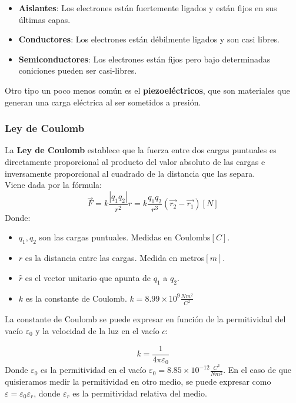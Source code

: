 \begin{itemize}
    \item \textbf{Aislantes}: Los electrones están fuertemente ligados y están fijos en sus últimas capas. 
    \item \textbf{Conductores}: Los electrones están débilmente ligados y son casi libres.
    \item \textbf{Semiconductores}: Los electrones están fijos pero bajo determinadas coniciones pueden ser casi-libres.
\end{itemize}
Otro tipo un poco menos común es el \textbf{piezoeléctricos}, que son materiales que generan una carga eléctrica al ser sometidos a presión.
\subsubsection{Ley de Coulomb}
La \textbf{Ley de Coulomb} establece que la fuerza entre dos cargas puntuales es directamente proporcional al producto del valor absoluto de las cargas e inversamente proporcional al cuadrado de la distancia que las separa.\\
Viene dada por la fórmula:
\begin{equation}
    \vec{F} = k \frac{|q_1 q_2|}{r^2} \hat{r} = k \frac{q_1 q_2}{r^3} (\vec{r_2} - \vec{r_1}) [N]
\end{equation}
Donde: 
\begin{itemize}
    \item $q_1, q_2$ son las cargas puntuales. Medidas en Coulombs$[C]$.
    \item $r$ es la distancia entre las cargas. Medida en metros$[m]$.
    \item $\hat{r}$ es el vector unitario que apunta de $q_1$ a $q_2$.
    \item $k$ es la constante de Coulomb. $k = 8.99 \times 10^9 \frac{Nm^2}{C^2}$
\end{itemize}

\noindent
La constante de Coulomb se puede expresar en función de la permitividad del vacío $\varepsilon_0$ y la velocidad de la luz en el vacío $c$:

\begin{equation}
    k = \frac{1}{4\pi \varepsilon_0}
\end{equation}
Donde $\varepsilon_0$ es la permitividad en el vacío $\varepsilon_0 = 8.85 \times 10^{-12} \frac{C^2}{Nm^2}$. En el caso de que quisieramos medir la permitividad en otro medio, se puede expresar como $\varepsilon = \varepsilon_0 \varepsilon_r$, donde $\varepsilon_r$ es la permitividad relativa del medio.


